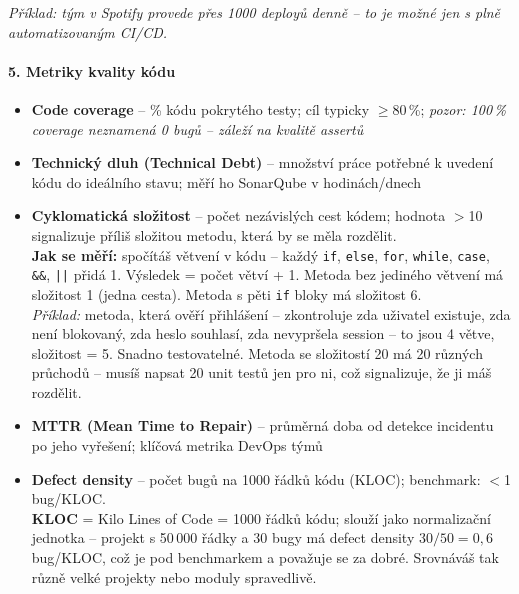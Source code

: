 \textit{Příklad: tým v Spotify provede přes 1000 deployů denně -- to je možné jen s plně automatizovaným CI/CD.}

\paragraph{5. Metriky kvality kódu}
\begin{itemize}
  \item \textbf{Code coverage} -- \% kódu pokrytého testy; cíl typicky $\geq$80\,\%;
    \textit{pozor: 100\,\% coverage neznamená 0 bugů -- záleží na kvalitě assertů}
  \item \textbf{Technický dluh (Technical Debt)} -- množství práce potřebné k uvedení kódu do ideálního stavu;
    měří ho SonarQube v hodinách/dnech
  \item \textbf{Cyklomatická složitost} -- počet nezávislých cest kódem; hodnota $>$10 signalizuje
    příliš složitou metodu, která by se měla rozdělit. \\
    \textbf{Jak se měří:} spočítáš větvení v kódu -- každý \texttt{if}, \texttt{else}, \texttt{for},
    \texttt{while}, \texttt{case}, \texttt{\&\&}, \texttt{||} přidá 1. Výsledek = počet větví + 1.
    Metoda bez jediného větvení má složitost 1 (jedna cesta). Metoda s pěti \texttt{if} bloky
    má složitost 6. \\
    \textit{Příklad:} metoda, která ověří přihlášení -- zkontroluje zda uživatel existuje,
    zda není blokovaný, zda heslo souhlasí, zda nevypršela session -- to jsou 4 větve,
    složitost = 5. Snadno testovatelné. Metoda se složitostí 20 má 20 různých průchodů --
    musíš napsat 20 unit testů jen pro ni, což signalizuje, že ji máš rozdělit.

  \item \textbf{MTTR (Mean Time to Repair)} -- průměrná doba od detekce incidentu po jeho vyřešení;
    klíčová metrika DevOps týmů

  \item \textbf{Defect density} -- počet bugů na 1000 řádků kódu (KLOC); benchmark: $<$1 bug/KLOC. \\
    \textbf{KLOC} = Kilo Lines of Code = 1000 řádků kódu; slouží jako normalizační jednotka --
    projekt s 50\,000 řádky a 30 bugy má defect density $30 / 50 = 0{,}6$ bug/KLOC, což je pod
    benchmarkem a považuje se za dobré. Srovnáváš tak různě velké projekty nebo moduly spravedlivě.
\end{itemize}

